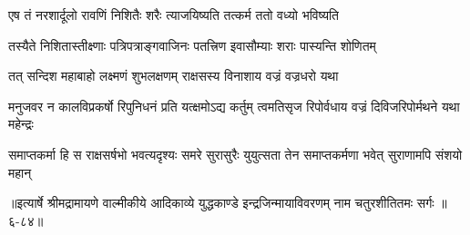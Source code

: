 \twolineshloka
{एष तं नरशार्दूलो रावणिं निशितैः शरैः}
{त्याजयिष्यति तत्कर्म ततो वध्यो भविष्यति} %

\twolineshloka
{तस्यैते निशितास्तीक्ष्णाः पत्रिपत्राङ्गवाजिनः}
{पतत्त्रिण इवासौम्याः शराः पास्यन्ति शोणितम्} %

\twolineshloka
{तत् सन्दिश महाबाहो लक्ष्मणं शुभलक्षणम्}
{राक्षसस्य विनाशाय वज्रं वज्रधरो यथा} %

\twolineshloka
{मनुजवर न कालविप्रकर्षो रिपुनिधनं प्रति यत्क्षमोऽद्य कर्तुम्}
{त्वमतिसृज रिपोर्वधाय वज्रं दिविजरिपोर्मथने यथा महेन्द्रः} %

\twolineshloka
{समाप्तकर्मा हि स राक्षसर्षभो भवत्यदृश्यः समरे सुरासुरैः}
{युयुत्सता तेन समाप्तकर्मणा भवेत् सुराणामपि संशयो महान्} %


॥इत्यार्षे श्रीमद्रामायणे वाल्मीकीये आदिकाव्ये युद्धकाण्डे इन्द्रजिन्मायाविवरणम् नाम चतुरशीतितमः सर्गः ॥६-८४॥
